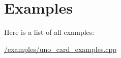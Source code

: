 \section{\-Examples}
\-Here is a list of all examples\-:\begin{DoxyCompactItemize}
\item 
\hyperlink{_2examples_2uno_card_examples_8cpp-example}{/examples/uno\-\_\-card\-\_\-examples.\-cpp}
\end{DoxyCompactItemize}
